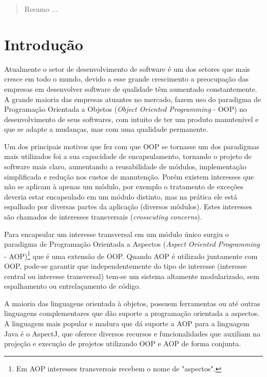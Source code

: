 \documentclass[tc,oneside]{iiufrgs}
\begin{document}
\listoffigures

\listoftables

\begin{abstract}

Resumo ...

\end{abstract}


\chapter{Introdução}
\label{cap1}
Atualmente o setor de desenvolvimento de software é um dos setores que mais cresce em todo o mundo, devido a esse grande crescimento a preocupação das empresas em desenvolver software de qualidade têm aumentado constantemente. A grande maioria das empresas atuantes no mercado, fazem uso do paradigma de Programação Orientada a Objetos (\textit{Object Oriented Programming} - OOP) no desenvolvimento de seus softwares, com intuito de ter um produto manutenível e que se adapte a mudanças, mas com uma qualidade permanente.

Um dos principais motivos que fez com que OOP se tornasse um dos paradigmas mais utilizados foi a sua capacidade de encapsulamento, tornando o projeto de software mais claro, aumentando a reusabilidade de módulos, implementação simplificada e redução nos custos de manutenção. Porém existem interesses que não se aplicam à apenas um módulo, por exemplo o tratamento de exceções deveria estar encapsulado em um módulo distinto, mas na prática ele está espalhado por diversas partes da aplicação (diversos módulos). Estes interesses são chamados de interesses transversais (\textit{crosscuting concerns}).

Para encapsular um interesse transversal em um módulo único surgiu o paradigma de Programação Orientada a Aspectos (\textit{Aspect Oriented Programming} - AOP)\footnote{Em AOP interesses transversais recebem o nome de "aspectos".} que é uma extensão de OOP. Quando AOP é utilizado juntamente com OOP, pode-se garantir que independentemente do tipo de interesse (interesse central ou interesse transversal) tem-se um sistema altamente modularizado, sem espalhamento ou entrelaçamento de código.

A maioria das linguagens orientada à objetos, possuem ferramentas ou até outras linguagens complementares que dão suporte a programação orientada a aspectos. A linguagem mais popular e madura que dá suporte a AOP para a linguagem Java é o AspectJ, que oferece diversos recursos e funcionalidades que auxiliam na projeção e execução de projetos utilizando OOP e AOP de forma conjunta.
\end{document}
